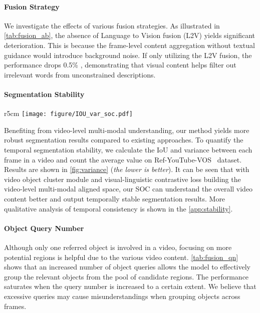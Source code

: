 \documentclass{article}
\begin{document}
\vspace{-5pt}
\paragraph{Fusion Strategy}
We investigate the effects of various fusion strategies. As illustrated in \cref{tab:fusion_ab}, the absence of Language to Vision fusion (L2V) yields significant deterioration. This is because the frame-level content aggregation without textual guidance would introduce background noise. If only utilizing the L2V fusion, the performance drops 0.5\% , demonstrating that visual content helps filter out irrelevant words from unconstrained descriptions.   


\vspace{-5pt}
\paragraph{Segmentation Stability}
\begin{wrapfigure}{r}{5cm}
\vspace{-10pt}
        \centering
        \texttt{[image: figure/IOU\_var\_soc.pdf]}
    \vspace{-15pt}
    \caption{IoU and  variance.}
    \label{fig:variance}
    \vspace{-5pt}
\end{wrapfigure} 
Benefiting from video-level multi-modal understanding, our method yields more robust segmentation results compared to existing approaches. 
To quantify the temporal segmentation stability, we calculate the IoU and  variance between each frame in a video and count the average value on Ref-YouTube-VOS~\cite{urvos} dataset. Results are shown in \cref{fig:variance} (\textit{the lower is better}). It can be seen that with video object cluster module and visual-linguistic contrastive loss building the video-level multi-modal aligned space, our SOC can understand the overall video content better and output temporally stable segmentation results.
More qualitative analysis of temporal consistency is shown in the \cref{app:stability}.

\vspace{-5pt}
\paragraph{Object Query Number}
Although only one referred object is involved in a video, focusing on more potential regions is helpful due to the various video content. \cref{tab:fusion_qn} shows that an increased number of object queries allows the model to effectively group the relevant objects from the pool of candidate regions. The performance saturates when the query number is increased to a certain extent. We believe that excessive queries may cause misunderstandings when grouping objects across frames.          
\end{document}
